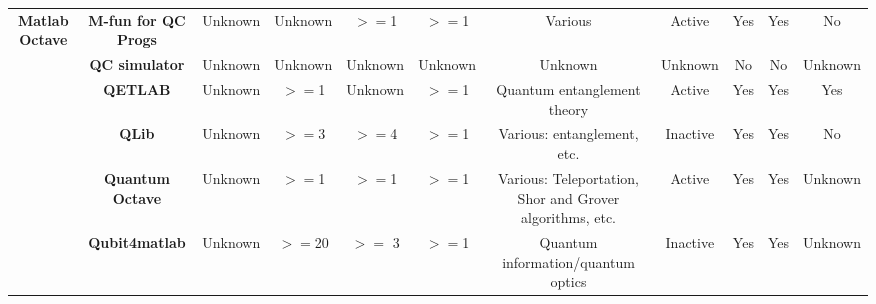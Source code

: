 \documentclass[conference]{IEEEtran}
\begin{document}
\begin{table*}[h!]
{\begin{tabular}{c|c|c|c|c|c|c|c|c|c|c}
	
    \multirow{6}{*}{\textbf{Matlab Octave}} & \textbf{M-fun for QC Progs } & Unknown & Unknown &$>=$1  &$>=$1  & Various & Active & Yes   & Yes   & No \\
	           & \textbf{QC simulator } & Unknown & Unknown & Unknown & Unknown & Unknown & Unknown & No    & No    & Unknown \\
	           & \textbf{QETLAB } & Unknown &$>=$1  & Unknown &$>=$1  & Quantum entanglement theory & Active & Yes   & Yes   & Yes \\
	           & \textbf{QLib } & Unknown &$>=$3  &$>=$4  &$>=$1  & Various: entanglement, etc. & Inactive & Yes   & Yes   & No \\
	           & \textbf{Quantum Octave } & Unknown &$>=$1  &$>=$1  &$>=$1  & Various: Teleportation, Shor and Grover algorithms, etc. & Active & Yes   & Yes   & Unknown \\
	           & \textbf{Qubit4matlab } & Unknown & $>=$20 & $>=$ 3   &$>=$1  & Quantum information/quantum optics & Inactive & Yes   & Yes   & Unknown \\
	\hline	

	
	

\end{tabular}}
\end{table*}
\end{document}
